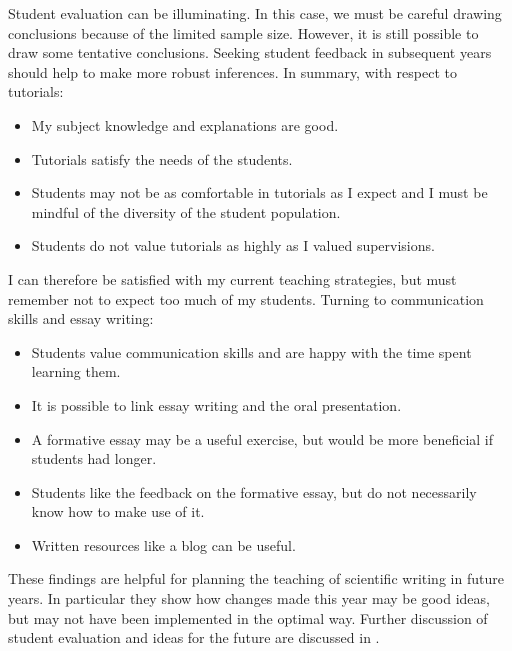 Student evaluation can be illuminating. In this case, we must be careful drawing conclusions because of the limited sample size. However, it is still possible to draw some tentative conclusions. Seeking student feedback in subsequent years should help to make more robust inferences. In summary, with respect to tutorials:
\begin{itemize}
\item My subject knowledge and explanations are good.
\item Tutorials satisfy the needs of the students.
\item Students may not be as comfortable in tutorials as I expect and I must be mindful of the diversity of the student population.
\item Students do not value tutorials as highly as I valued supervisions.
\end{itemize}
I can therefore be satisfied with my current teaching strategies, but must remember not to expect too much of my students. Turning to communication skills and essay writing:
\begin{itemize}
\item Students value communication skills and are happy with the time spent learning them.
\item It is possible to link essay writing and the oral presentation.
\item A formative essay may be a useful exercise, but would be more beneficial if students had longer.
\item Students like the feedback on the formative essay, but do not necessarily know how to make use of it.
\item Written resources like a blog can be useful.
\end{itemize}
These findings are helpful for planning the teaching of scientific writing in future years. In particular they show how changes made this year may be good ideas, but may not have been implemented in the optimal way. Further discussion of student evaluation and ideas for the future are discussed in .
